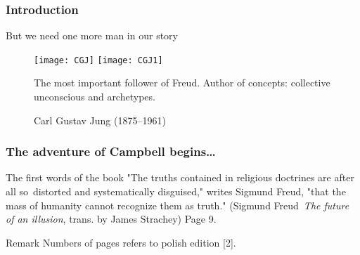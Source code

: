 \documentclass{beamer}  %
\begin{document}
\begin{frame}
  \frametitle{Introduction}

  \begin{block}{But we need one more man in our story}
    \begin{figure}
      \centering

      \texttt{[image: CGJ]}
      \texttt{[image: CGJ1]}
      \caption{Carl Gustav Jung (1875--1961)}
      The most important follower of Freud. Author of concepts:
      collective unconscious and archetypes.
    \end{figure}
  \end{block}

\end{frame}



\begin{frame}
  \frametitle{The adventure of Campbell begins\ldots}

  \begin{block}{The first words of the book}
    "The truths contained in religious doctrines are after all
    so~distorted and systematically disguised," writes Sigmund Freud,
    "that the mass of humanity cannot recognize them as
    truth." %
    (Sigmund Freud~\emph{The future of an illusion}, trans. by James
    Strachey) Page 9.
  \end{block}

  \begin{block}{Remark}
    Numbers of pages refers to polish edition [2].
  \end{block}

\end{frame}
\end{document}
